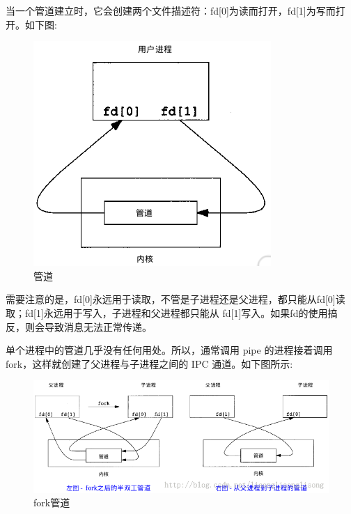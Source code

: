 当一个管道建立时，它会创建两个文件描述符：fd[0]为读而打开，fd[1]为写而打开。如下图:
\begin{figure}[H]
  \centering
  \includegraphics[scale=0.8]{pipe.png}
  \caption{管道}
  \label{fig:pipe}
\end{figure}
需要注意的是，fd[0]永远用于读取，不管是子进程还是父进程，都只能从fd[0]读取；fd[1]永远用于写入，子进程和父进程都只能从
fd[1]写入。如果fd的使用搞反，则会导致消息无法正常传递。

单个进程中的管道几乎没有任何用处。所以，通常调用 pipe 的进程接着调用 fork，这样就创建了父进程与子进程之间的 IPC 通道。如下图所示:
\begin{figure}[H]
  \centering
  \includegraphics[scale=0.6]{fork_pipe.png}
  \caption{fork管道}
  \label{fig:fork_pipe}
\end{figure}

